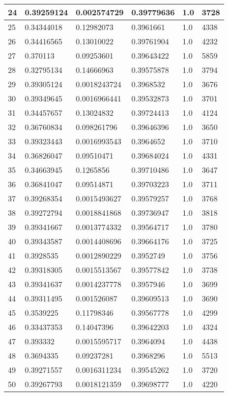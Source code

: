 \begin{longtable}{|l|l|l|l|l|l|}
24 & 0.39259124 & 0.002574729 & 0.39779636 & 1.0 & 3728 \\ \hline 
25 & 0.34344018 & 0.12982073 & 0.3961661 & 1.0 & 4338 \\ \hline 
26 & 0.34416565 & 0.13010022 & 0.39761904 & 1.0 & 4232 \\ \hline 
27 & 0.370113 & 0.09253601 & 0.39643422 & 1.0 & 5859 \\ \hline 
28 & 0.32795134 & 0.14666963 & 0.39575878 & 1.0 & 3794 \\ \hline 
29 & 0.39305124 & 0.0018243724 & 0.3968532 & 1.0 & 3676 \\ \hline 
30 & 0.39349645 & 0.0016966441 & 0.39532873 & 1.0 & 3701 \\ \hline 
31 & 0.34457657 & 0.13024832 & 0.39724413 & 1.0 & 4124 \\ \hline 
32 & 0.36760834 & 0.098261796 & 0.39646396 & 1.0 & 3650 \\ \hline 
33 & 0.39323443 & 0.0016993543 & 0.3964652 & 1.0 & 3710 \\ \hline 
34 & 0.36826047 & 0.09510471 & 0.39684024 & 1.0 & 4331 \\ \hline 
35 & 0.34663945 & 0.1265856 & 0.39710486 & 1.0 & 3647 \\ \hline 
36 & 0.36841047 & 0.09514871 & 0.39703223 & 1.0 & 3711 \\ \hline 
37 & 0.39268354 & 0.0015493627 & 0.39579257 & 1.0 & 3768 \\ \hline 
38 & 0.39272794 & 0.0018841868 & 0.39736947 & 1.0 & 3818 \\ \hline 
39 & 0.39341667 & 0.0013774332 & 0.39564717 & 1.0 & 3780 \\ \hline 
40 & 0.39343587 & 0.0014408696 & 0.39664176 & 1.0 & 3725 \\ \hline 
41 & 0.3928535 & 0.0012890229 & 0.3952749 & 1.0 & 3756 \\ \hline 
42 & 0.39318305 & 0.0015513567 & 0.39577842 & 1.0 & 3738 \\ \hline 
43 & 0.39341637 & 0.0014237778 & 0.3957946 & 1.0 & 3699 \\ \hline 
44 & 0.39311495 & 0.001526087 & 0.39609513 & 1.0 & 3690 \\ \hline 
45 & 0.3539225 & 0.11798346 & 0.39567778 & 1.0 & 4299 \\ \hline 
46 & 0.33437353 & 0.14047396 & 0.39642203 & 1.0 & 4324 \\ \hline 
47 & 0.393332 & 0.0015595717 & 0.3964094 & 1.0 & 4438 \\ \hline 
48 & 0.3694335 & 0.09237281 & 0.3968296 & 1.0 & 5513 \\ \hline 
49 & 0.39271557 & 0.0016311234 & 0.39545262 & 1.0 & 3720 \\ \hline 
50 & 0.39267793 & 0.0018121359 & 0.39698777 & 1.0 & 4220 \\ \hline 
\end{longtable}